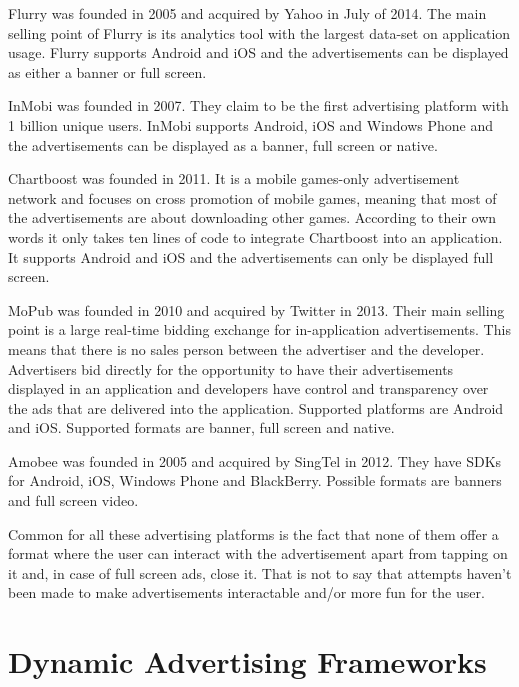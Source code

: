 Flurry was founded in 2005 and acquired by Yahoo in July of 2014. \cite{crunchbase-flurry} The main selling point of Flurry is its analytics tool with the largest data-set on application usage. \cite{maps-yankeegroup} Flurry supports Android and iOS and the advertisements can be displayed as either a banner or full screen.

InMobi was founded in 2007. \cite{crunchbase-inmobi} They claim to be the first advertising platform with 1 billion unique users. \cite{inmobi} InMobi supports Android, iOS and Windows Phone \cite{inmobi-monetize} and the advertisements can be displayed as a banner, full screen or native. \cite{inmobi-sdk}

Chartboost was founded in 2011. \cite{crunchbase-chartboost} It is a mobile games-only advertisement network and focuses on cross promotion of mobile games, meaning that most of the advertisements are about downloading other games. According to their own words it only takes ten lines of code to integrate Chartboost into an application. \cite{chartboost} It supports Android and iOS and the advertisements can only be displayed full screen.\cite{hongikiat-monetize}

MoPub was founded in 2010 and acquired by Twitter in 2013. \cite{crunchbase-mopub} Their main selling point is a large real-time bidding exchange for in-application advertisements. This means that there is no sales person between the advertiser and the developer. Advertisers bid directly for the opportunity to have their advertisements displayed in an application and developers have  control and transparency over the ads that are delivered into the application. \cite{mopub-marketplace} Supported platforms are Android and iOS. \cite{mopub-resources} Supported formats are banner, full screen and native.

Amobee was founded in 2005 and acquired by SingTel in 2012. \cite{crunchbase-amobee} They have SDKs for Android, iOS, Windows Phone and BlackBerry. Possible formats are banners and full screen video.

Common for all these advertising platforms is the fact that none of them offer a format where the user can interact with the advertisement apart from tapping on it and, in case of full screen ads, close it. That is not to say that attempts haven’t been made to make advertisements interactable and/or more fun for the user.

\section{Dynamic Advertising Frameworks}

